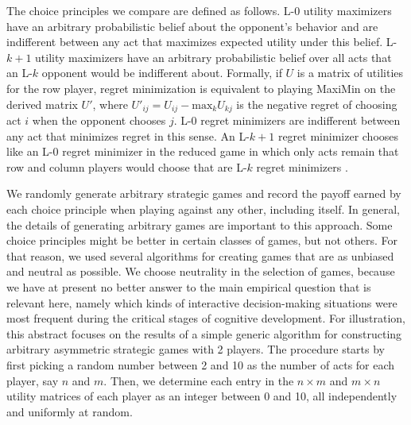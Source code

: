 \documentclass[10pt]{article}
\begin{document}
The choice principles we compare are defined as follows. L-0 utility
maximizers have an arbitrary probabilistic belief about the opponent's
behavior and are indifferent between any act that maximizes expected
utility under this belief. L-$k+1$ utility maximizers have an
arbitrary probabilistic belief over all acts that an L-$k$ opponent
would be indifferent about. Formally, if $U$ is a matrix of utilities
for the row player, regret minimization is equivalent to playing
MaxiMin on the derived matrix $U'$, where $U'_{ij} = U_{ij} -
\textrm{max}_{k} U_{kj}$ is the negative regret of choosing act $i$
when the opponent chooses $j$. L-0 regret minimizers are indifferent
between any act that minimizes regret in this sense. An L-$k+1$ regret
minimizer chooses like an L-0 regret minimizer in the reduced game in
which only acts remain that row and column players would choose that
are L-$k$ regret minimizers
\citep[see][]{HalpernPass2012:Iterated-Regret}.

We randomly generate arbitrary strategic games and record the payoff
earned by each choice principle when playing against any other,
including itself. In general, the details of generating arbitrary
games are important to this approach. Some choice principles might be
better in certain classes of games, but not others. For that reason,
we used several algorithms for creating games that are as unbiased and
neutral as possible. We choose neutrality in the selection of games,
because we have at present no better answer to the main empirical
question that is relevant here, namely which kinds of interactive
decision-making situations were most frequent during the critical
stages of cognitive development. For illustration, this abstract
focuses on the results of a simple generic algorithm for constructing
arbitrary asymmetric strategic games with 2 players. The procedure
starts by first picking a random number between 2 and 10 as the number
of acts for each player, say $n$ and $m$. Then, we determine each
entry in the $n \times m$ and $m \times n$ utility matrices of each
player as an integer between 0 and 10, all independently and uniformly
at random.

 
\end{document}
